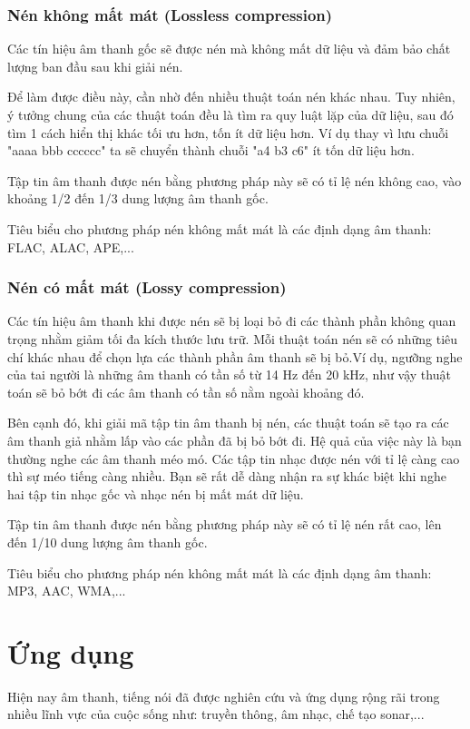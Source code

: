 \subsubsection{Nén không mất mát (Lossless compression)}
Các tín hiệu âm thanh gốc sẽ được nén mà không mất dữ liệu và đảm bảo chất lượng ban đầu sau khi giải nén.

Để làm được điều này, cần nhờ đến nhiều thuật toán nén khác nhau. Tuy nhiên, ý tưởng chung của các thuật toán đều là tìm ra quy luật lặp của dữ liệu, sau đó tìm 1 cách hiển thị khác tối ưu hơn, tốn ít dữ liệu hơn. Ví dụ thay vì lưu chuỗi "aaaa bbb cccccc" ta sẽ chuyển thành chuỗi "a4 b3 c6" ít tốn dữ liệu hơn.

Tập tin âm thanh được nén bằng phương pháp này sẽ có tỉ lệ nén không cao, vào khoảng 1/2 đến 1/3 dung lượng âm thanh gốc.

Tiêu biểu cho phương pháp nén không mất mát là các định dạng âm thanh: FLAC, ALAC, APE,...

\subsubsection{Nén có mất mát (Lossy compression)}
Các tín hiệu âm thanh khi được nén sẽ bị loại bỏ đi các thành phần không quan trọng nhằm giảm tối đa kích thước lưu trữ. Mỗi thuật toán nén sẽ có những tiêu chí khác nhau để chọn lựa các thành phần âm thanh sẽ bị bỏ.Ví dụ, ngưỡng nghe của tai người là những âm thanh có tần số từ 14 Hz đến 20 kHz, như vậy thuật toán sẽ bỏ bớt đi các âm thanh có tần số nằm ngoài khoảng đó.

Bên cạnh đó, khi giải mã tập tin âm thanh bị nén, các thuật toán sẽ tạo ra các âm thanh giả nhằm lấp vào các phần đã bị bỏ bớt đi. Hệ quả của việc này là bạn thường nghe các âm thanh méo mó. Các tập tin nhạc được nén với tỉ lệ càng cao thì sự méo tiếng càng nhiều. Bạn sẽ rất dễ dàng nhận ra sự khác biệt khi nghe hai tập tin nhạc gốc và nhạc nén bị mất mát dữ liệu.

Tập tin âm thanh được nén bằng phương pháp này sẽ có tỉ lệ nén rất cao, lên đến 1/10 dung lượng âm thanh gốc.

Tiêu biểu cho phương pháp nén không mất mát là các định dạng âm thanh: MP3, AAC, WMA,...

\section{Ứng dụng}
Hiện nay âm thanh, tiếng nói đã được nghiên cứu và ứng dụng rộng rãi trong nhiều lĩnh vực của cuộc sống như: truyền thông, âm nhạc, chế tạo sonar,...

